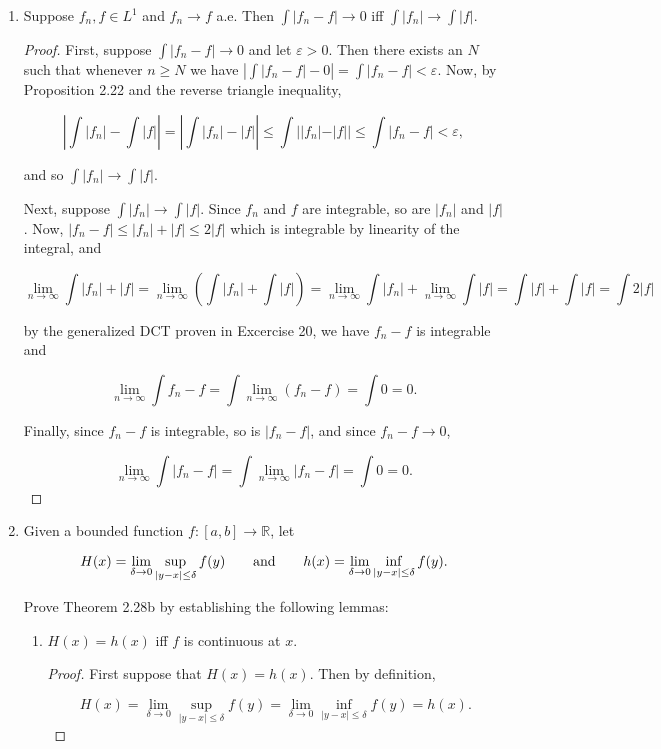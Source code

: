 \documentclass[11pt,oneside,english]{amsart}
\theoremstyle{definition}
\newcommand{\aspace}{\hspace{7mm}\text{and}\hspace{7mm}}
\newcommand{\lom}[2]{\lim_{{#1}\rightarrow{#2}}}
\newcommand{\R}{\mathbb{R}}
\newcommand{\ve}{\varepsilon}
\begin{document}
\begin{enumerate}
\item Suppose $f_n, f\in L^1$ and $f_n\rightarrow f$ a.e. Then $\int |f_n-f|\rightarrow 0$ iff $\int |f_n|\rightarrow \int |f|$.

\begin{proof}
First, suppose $\int |f_n-f|\rightarrow 0$ and let $\ve>0$. Then there exists an $N$ such that whenever $n\geq N$ we have $\left|\int |f_n-f|-0\right|=\int |f_n-f|<\ve$. Now, by Proposition 2.22 and the reverse triangle inequality, 

\[
\left|\int |f_n|-\int |f|\right|=\left|\int |f_n|-|f|\right|\leq\int||f_n|-|f||\leq\int |f_n-f|<\ve,
\]

and so $\int |f_n|\rightarrow \int |f|$.

Next, suppose $\int |f_n|\rightarrow \int |f|$. Since $f_n$ and $f$ are integrable, so are $|f_n|$ and $|f|$. Now, $|f_n-f|\leq |f_n|+|f|\leq2|f|$ which is integrable by linearity of the integral, and 

\[
\lom{n}{\infty}\int|f_n|+|f|=\lom{n}{\infty}\left(\int |f_n|+\int |f|\right)=\lom{n}{\infty}\int |f_n|+\lom{n}{\infty}\int |f|=\int |f|+\int |f|=\int 2|f|
\]

by the generalized DCT proven in Excercise 20, we have $f_n-f$ is integrable and 

\[
\lom{n}{\infty}\int f_n-f=\int \lom{n}{\infty}(f_n-f)=\int 0=0.
\]

Finally, since $f_n-f$ is integrable, so is $|f_n-f|$, and since $f_n-f\rightarrow0$, 

\[
\lom{n}{\infty}\int |f_n-f|=\int \lom{n}{\infty}|f_n-f|=\int 0=0.
\]
\end{proof}

\setcounter{enumi}{22}

\item Given a bounded function $f:[a,b]\rightarrow \R$, let

\[
H(x)=\lim_{\delta\rightarrow 0}\sup_{|y-x|\leq \delta}f(y)\aspace h(x)=\lim_{\delta\rightarrow 0}\inf_{|y-x|\leq \delta}f(y).
\]

Prove Theorem 2.28b by establishing the following lemmas:

\begin{enumerate}
\item $H(x)=h(x)$ iff $f$ is continuous at $x$.

\begin{proof}
First suppose that $H(x)=h(x)$. Then by definition,

\[
H(x)=\lim_{\delta\rightarrow 0}\sup_{|y-x|\leq \delta}f(y)=\lim_{\delta\rightarrow 0}\inf_{|y-x|\leq \delta}f(y)=h(x).
\]


\end{proof}
\end{enumerate}
\end{enumerate}
\end{document}
